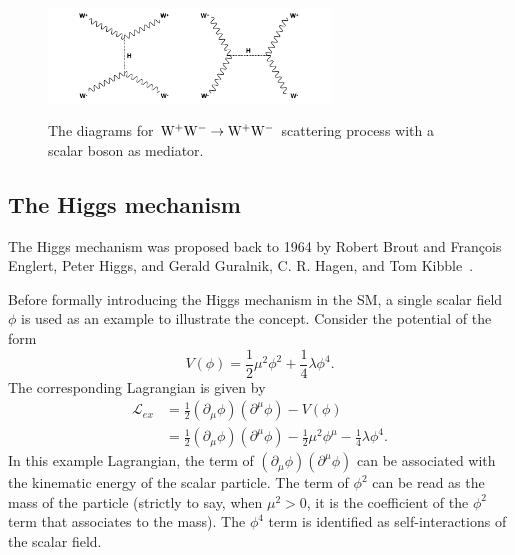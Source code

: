 \begin{figure}[!ht]
  \begin{center}  
    \includegraphics[width=0.67\textwidth]{Fig/WWWWscattering_Higgs}\\
    \caption{The diagrams for $\mathrm{W}^{+}\mathrm{W}^{-}\to\mathrm{W}^{+}\mathrm{W}^{-}$ scattering process with a scalar boson as mediator. \label{fig:WWWWscattering_Higgs}}  
  \end{center}
\end{figure}

\subsection{The Higgs mechanism}
The Higgs mechanism was proposed back to 1964 by Robert Brout and François Englert, Peter Higgs, and Gerald Guralnik, C. R. Hagen, and Tom Kibble~\cite{PhysRevLett.13.321,PhysRevLett.13.508,PhysRevLett.13.585}.

Before formally introducing the Higgs mechanism in the SM, a single scalar field $\phi$ is used as an example to illustrate the concept. Consider the potential of the form
\begin{equation}
V(\phi) = \frac{1}{2}\mu^{2}\phi^{2} + \frac{1}{4}\lambda\phi^{4}.
\end{equation}
The corresponding Lagrangian is given by 
\begin{equation}
\begin{split}
\mathcal{L}_{ex} & = \frac{1}{2}(\partial_{\mu}\phi)(\partial^{\mu}\phi)- V(\phi) \\
& = \frac{1}{2}(\partial_{\mu}\phi)(\partial^{\mu}\phi) - \frac{1}{2}\mu^{2}\phi^{\mu} - \frac{1}{4}\lambda\phi^{4}.
\end{split}
\end{equation}
In this example Lagrangian, the term of $(\partial_{\mu}\phi)(\partial^{\mu}\phi)$ can be associated with the kinematic energy of the scalar particle. The term of $\phi^{2}$ can be read as the mass of the particle (strictly to say, when $\mu^{2}>0$, it is the coefficient of the $\phi^{2}$ term that associates to the mass). The $\phi^{4}$ term is identified as self-interactions of the scalar field.

